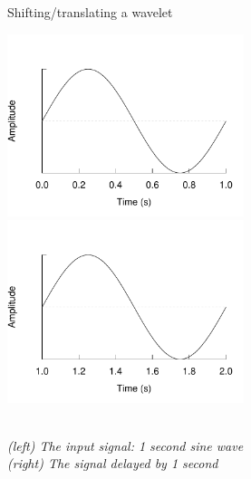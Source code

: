 \begin{figure}[h]
\caption{Shifting/translating a wavelet}\label{figure:shifting}
\caption*{\\[1em]\footnotesize\textit{(left) The input signal: 1 second sine
wave\\ (right) The signal delayed by 1 second}}
\centering
	\includegraphics[width=196pt]{images/sine_full.pdf}
	\hspace{1em}
	\includegraphics[width=196pt]{images/sine_shifted.pdf}
\end{figure}
